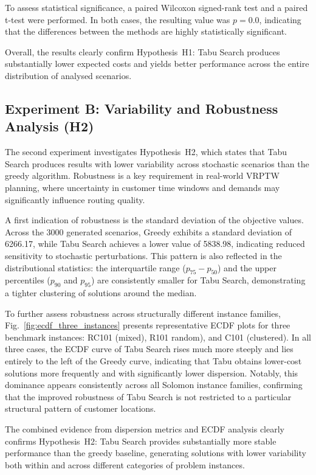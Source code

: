 To assess statistical significance, a paired Wilcoxon signed-rank test and a paired t-test were performed. In both cases, the resulting value was $p = 0.0$, indicating that the differences between the methods are highly statistically significant.

Overall, the results clearly confirm Hypothesis~H1: Tabu Search produces substantially lower expected costs and yields better performance across the entire distribution of analysed scenarios.

\subsection{Experiment B: Variability and Robustness Analysis (H2)}

The second experiment investigates Hypothesis~H2, which states that Tabu Search produces results with lower variability across stochastic scenarios than the greedy algorithm. Robustness is a key requirement in real-world VRPTW planning, where uncertainty in customer time windows and demands may significantly  influence routing quality.

A first indication of robustness is the standard deviation of the objective values. Across the 3000 generated scenarios, Greedy exhibits a standard deviation of 6266.17, while Tabu Search achieves a lower value of 5838.98, indicating reduced sensitivity to stochastic perturbations. This pattern is also reflected in the distributional statistics: the interquartile range ($p_{75}-p_{50}$) and the upper percentiles ($p_{90}$ and $p_{95}$) are consistently smaller for Tabu Search, demonstrating a tighter clustering of solutions around the median.

To further assess robustness across structurally different instance families, Fig.~\ref{fig:ecdf_three_instances} presents representative ECDF plots for three benchmark instances: RC101 (mixed), R101 random), and C101 (clustered). In all three cases, the ECDF curve of Tabu Search rises much more steeply and lies entirely to the left of the Greedy curve, indicating that Tabu obtains lower-cost solutions more frequently and with significantly lower dispersion. Notably, this dominance appears consistently across all Solomon instance families, confirming that the improved robustness of Tabu Search is not restricted to a particular structural pattern of customer locations.

The combined evidence from dispersion metrics and ECDF analysis clearly confirms Hypothesis~H2: Tabu Search provides substantially more stable performance than the greedy baseline, generating solutions with lower variability both within and across different categories of problem instances.

